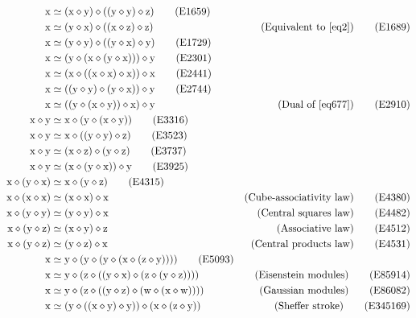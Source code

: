 \begin{align}
    \x &\formaleq (\x \op \y) \op ((\y \op \y) \op \z) \label{eq1659}\tag{E1659} \\
    \x &\formaleq (\y \op \x) \op ((\x \op \z) \op \z) & \hbox{(Equivalent to~\eqref{eq2})} \label{eq1689}\tag{E1689} \\
    \x &\formaleq (\y \op \y) \op ((\y \op \x) \op \y) \label{eq1729}\tag{E1729} \\
    \x &\formaleq (\y \op (\x \op (\y \op \x))) \op \y \label{eq2301}\tag{E2301} \\
        \x &\formaleq (\x \op ((\x \op \x) \op \x)) \op \x \label{eq2441}\tag{E2441} \\
        \x &\formaleq ((\y \op \y) \op (\y \op \x)) \op \y \label{eq2744}\tag{E2744} \\
        \x &\formaleq ((\y \op (\x \op \y)) \op \x) \op \y & \hbox{(Dual of \eqref{eq677})} \label{eq2910}\tag{E2910} \\
        \x \op \y &\formaleq \x \op (\y \op (\x \op \y)) \label{eq3316}\tag{E3316} \\
        \x \op \y &\formaleq \x \op ((\y \op \y) \op \z) \label{eq3523}\tag{E3523} \\
        \x \op \y &\formaleq (\x \op \z) \op (\y \op \z) \label{eq3737}\tag{E3737} \\
        \x \op \y &\formaleq (\x \op (\y \op \x)) \op \y \label{eq3925}\tag{E3925} \\
        \x \op (\y \op \x) &\formaleq \x \op (\y \op \z) \label{eq4315}\tag{E4315} \\
        \x \op (\x \op \x) &\formaleq (\x \op \x) \op \x & \hbox{(Cube-associativity law)} \label{eq4380}\tag{E4380} \\
        \x \op (\y \op \y) &\formaleq (\y \op \y) \op \x & \hbox{(Central squares law)} \label{eq4482}\tag{E4482} \\
        \x \op (\y \op \z) &\formaleq (\x \op \y) \op \z & \hbox{(Associative law)} \label{eq4512}\tag{E4512} \\
        \x \op (\y \op \z) &\formaleq (\y \op \z) \op \x & \hbox{(Central products law)} \label{eq4531}\tag{E4531} \\
        \x &\formaleq \y \op (\y \op (\y \op (\x \op (\z \op \y)))) \label{eq5093}\tag{E5093} \\
        \x &\formaleq \y \op (\z \op ((\y \op \x) \op (\z \op (\y \op \z)))) & \hbox{(Eisenstein modules)} \label{eq85914} \tag{E85914} \\
        \x &\formaleq \y \op (\z \op ((\y \op \z) \op (\w \op (\x \op \w)))) & \hbox{(Gaussian modules)} \label{eq86082} \tag{E86082} \\
        \x &\formaleq (\y \op ((\x \op \y) \op \y)) \op (\x \op (\z \op \y)) & \hbox{(Sheffer stroke)} \label{eq345169}\tag{E345169}
\end{align}

